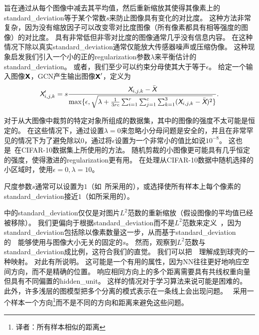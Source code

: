 旨在通过从每个图像中减去其平均值，然后重新缩放其使得其像素上的\gls{standard_deviation}等于某个常数$s$来防止图像具有变化的对比度。
这种方法非常复杂，因为没有缩放因子可以改变零对比度图像（所有像素都具有相等强度的图像）的对比度。
具有非常低但非零对比度的图像通常几乎没有信息内容。
在这种情况下除以真实\gls{standard_deviation}通常仅能放大传感器噪声或压缩伪像。
这种现象启发我们引入一个小的正的\gls{regularization}参数$\lambda$来平衡估计的\gls{standard_deviation}。
或者，我们至少可以约束分母使其大于等于$\epsilon$。
给定一个输入图像$\textsf{\textbf{X}}$，\gls{GCN}产生输出图像$\textsf{\textbf{X}}'$，定义为
\begin{align}
\label{eqn:123}
\textit{\textsf{X}}'_{i,j,k} = s\frac{\textit{\textsf{X}}_{i,j,k} - \bar{\textit{\textsf{X}}}}{\max\{ \epsilon, \sqrt{ \lambda + {\frac{1}{3rc}\sum_{i=1}^{r}\sum_{j=1}^{c}\sum_{k=1}^{3}} (\textit{\textsf{X}}_{i,j,k} - \bar{\textit{\textsf{X}}} )^2} \}}.
\end{align}


对于从大图像中裁剪的特定对象所组成的数据集，其中的图像的强度不太可能是恒定的。
在这些情况下，通过设置$\lambda = 0$来忽略小分母问题是安全的，并且在非常罕见的情况下为了避免除以$0$，通过将$\epsilon$设置为一个非常小的值比如说$10^{-8}$。
这也是~\citet{Goodfellow+al-arxiv-2013}在CIFAR-10数据集上所使用的方法。
随机剪裁的小图像更可能具有几乎恒定的强度，使得激进的\gls{regularization}更有用。
在处理从CIFAR-10数据中随机选择的小区域时，\citet{Coates2011}使用$\epsilon = 0, \lambda = 10$。

尺度参数$s$通常可以设置为$1$（如~\citet{Coates2011}所采用的），或选择使所有样本上每个像素的\gls{standard_deviation}接近$1$（如\citet{Goodfellow+al-arxiv-2013}所采用的）。


中的\gls{standard_deviation}仅仅是对图片$L^2$范数的重新缩放（假设图像的平均值已经被移除）。
我们更偏向于根据\gls{standard_deviation}而不是$L^2$范数来定义~，因为\gls{standard_deviation}包括除以像素数量这一步，从而基于\gls{standard_deviation}的~~能够使用与图像大小无关的固定的$s$。
然而，观察到$L^2$范数与\gls{standard_deviation}成比例，这符合我们的直觉。
我们可以把~~理解成到球壳的一种映射。
对此有所说明。
这可能是一个有用的属性，因为\gls{NN}往往更好地响应空间方向，而不是精确的位置。
响应相同方向上的多个距离需要具有共线权重向量但具有不同偏置的\gls{hidden_unit}。
这样的情况对于学习算法来说可能是困难的。
此外，许多浅层的图模型把多个分离的模式表示在一条线上会出现问题。
~采用一个样本一个方向\footnote{译者：所有样本相似的距离}而不是不同的方向和距离来避免这些问题。

